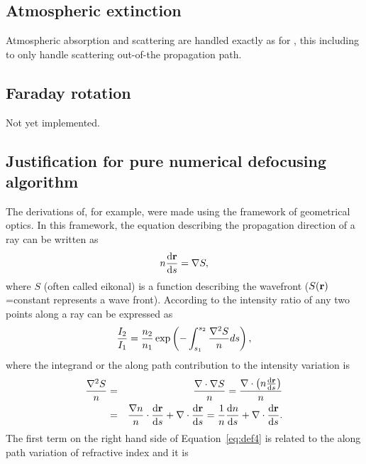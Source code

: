 \subsection{Atmospheric extinction}
\label{sec:rlink:atmext}
%
Atmospheric absorption and scattering are handled exactly as for
, this including to only handle scattering
out-of-the propagation path.



\subsection{Faraday rotation}
\label{sec:rlink:farrot}
%
Not yet implemented.



\subsection{Justification for pure numerical defocusing algorithm}
\label{sec:rlink:defoc2}
%
The derivations of, for example, \citet{haugstad:78:turbu} were made using the
framework of geometrical optics. In this framework, the equation describing the
propagation direction of a ray can be written as
\begin{equation}
\label{eq:eik}
n\frac{\mathrm{d} \bf{\ensuremath{r}}}{\mathrm{d} s}=\nabla S,
\end{equation}
where \(S\) (often called eikonal) is a function describing the wavefront
(\(S(\bf{\ensuremath{r}})\)=constant represents a wave front). According to
\cite{born:80} the intensity ratio of any two points along a ray can be
expressed as
\begin{equation}
\frac{I_{2}}{I_{1}}=\frac{n_{2}}{n_{1}}
\exp \left(-\int_{s_{1}}^{s_{2}}\frac{\nabla^{2}S}{n}ds\right),
\end{equation}
where the integrand 
or the along path contribution to the intensity variation is
\begin{eqnarray}
\label{eq:def4}
\frac{\nabla^{2}S}{n} &=& \frac{\nabla \cdot \nabla S}{n}
=\frac{\nabla \cdot \left(n\frac{\mathrm{d} \bf{\ensuremath{r}}}{\mathrm{d} s}\right)}{n} \nonumber \\
& = & 
\frac{\nabla n}{n} \cdot \frac{\mathrm{d} \bf{\ensuremath{r}}}{\mathrm{d} s}
+\nabla \cdot \frac{\mathrm{d} \bf{\ensuremath{r}}}{\mathrm{d} s}=
\frac{1}{n}\frac{\mathrm{d} n}{\mathrm{d} s}+\nabla \cdot \frac{\mathrm{d} \bf{\ensuremath{r}}}{\mathrm{d} s}. 
\end{eqnarray}
The first term on the right hand side of Equation~\ref{eq:def4}
is related to the along path variation of refractive index and it is 
